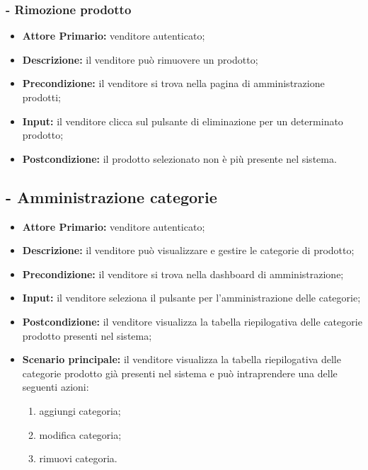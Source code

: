 \stepsubUserCase
\subsubsection{- Rimozione prodotto}
\begin{itemize}
    \item \textbf{Attore Primario:} venditore autenticato;
    \item \textbf{Descrizione:} il venditore può rimuovere un prodotto;
    \item \textbf{Precondizione:} il venditore si trova nella pagina di amministrazione prodotti;
    \item \textbf{Input:} il venditore clicca sul pulsante di eliminazione per un determinato prodotto;
    \item \textbf{Postcondizione:} il prodotto selezionato non è più presente nel sistema.
\end{itemize}


\stepUserCase
\subsection{ - Amministrazione categorie}
\begin{itemize}
    \item \textbf{Attore Primario:} venditore autenticato;
    \item \textbf{Descrizione:}  il venditore può visualizzare e gestire le categorie di prodotto;
    \item \textbf{Precondizione:}  il venditore si trova nella dashboard di amministrazione;
    \item \textbf{Input:} il venditore seleziona il pulsante per l'amministrazione delle categorie;
    \item \textbf{Postcondizione:} il venditore visualizza la tabella riepilogativa delle categorie prodotto presenti nel sistema;
    \item \textbf{Scenario principale:} il venditore visualizza la tabella riepilogativa delle categorie prodotto già presenti nel sistema e può intraprendere una delle seguenti azioni:
    \begin{enumerate}
        \item aggiungi categoria;
        \item modifica categoria;
        \item rimuovi categoria.
    \end{enumerate}
\end{itemize}

